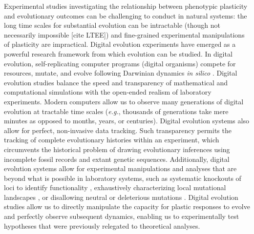 
Experimental studies investigating the relationship between phenotypic plasticity and evolutionary outcomes can be challenging to conduct in natural systems: 
the long time scales for substantial evolution can be intractable (though not necessarily impossible [cite LTEE]) and fine-grained experimental manipulations of plasticity are impractical.
Digital evolution experiments have emerged as a powerful research framework from which evolution can be studied.
In digital evolution, self-replicating computer programs (digital organisms) compete for resources, mutate, and evolve following Darwinian dynamics \textit{in silico}  \citep{mckinley_harnessing_2008}.
Digital evolution studies balance the speed and transparency of mathematical and computational simulations with the open-ended realism of laboratory experiments.
Modern computers allow us to observe many generations of digital evolution at tractable time scales (\textit{e.g.}, thousands of generations take mere minutes as opposed to months, years, or centuries).
Digital evolution systems also allow for perfect, non-invasive data tracking.
Such transparency permits the tracking of complete evolutionary histories within an experiment, which circumvents the historical problem of drawing evolutionary inferences using incomplete fossil records and extant genetic sequences.
Additionally, digital evolution systems allow for experimental manipulations and analyses that are beyond what is possible in laboratory systems, such as 
systematic knockouts of loci to identify functionality \citep{lenski_evolutionary_2003},
exhaustively characterizing local mutational landscapes \citep{lenski_genome_1999,canino-koning_fluctuating_2019},
or disallowing neutral or deleterious mutations \citep{covert_experiments_2013}. 
Digital evolution studies allow us to directly manipulate the capacity for plastic responses to evolve and perfectly observe subsequent dynamics, enabling us to experimentally test hypotheses that were previously relegated to theoretical analyses.

